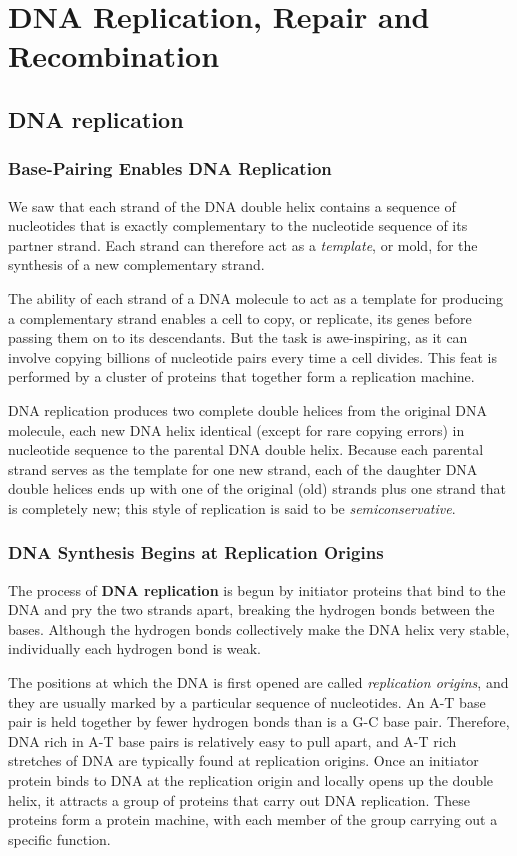 \chapter{DNA Replication, Repair and Recombination}

\section{DNA replication}

\subsection{Base-Pairing Enables DNA Replication}

We saw that each strand of the DNA double
helix contains a sequence of nucleotides that is exactly complementary to
the nucleotide sequence of its partner strand. Each strand can therefore
act as a \textit{template}, or mold, for the synthesis of a new complementary
strand.

The ability of each strand of a DNA molecule to act as a template for
producing a complementary strand enables a cell to copy, or replicate,
its genes before passing them on to its descendants. But the task is awe-inspiring,
as it can involve copying billions of nucleotide pairs every time
a cell divides. This feat is performed by a cluster of proteins that together form
a replication machine.

DNA replication produces two complete double helices from the original
DNA molecule, each new DNA helix identical (except for rare copying
errors) in nucleotide sequence to the parental DNA double helix.
Because each parental strand serves as the template for one
new strand, each of the daughter DNA double helices ends up with one
of the original (old) strands plus one strand that is completely new; this
style of replication is said to be \textit{semiconservative}.

\subsection{DNA Synthesis Begins at Replication Origins}

The process of \textbf{DNA replication} is begun by initiator proteins that bind
to the DNA and pry the two strands apart, breaking the hydrogen bonds
between the bases. Although the hydrogen bonds collectively
make the DNA helix very stable, individually each hydrogen bond is weak.

The positions at which the DNA is first opened are called \textit{replication
origins}, and they are usually marked by a particular sequence of nucleotides.
An A-T base pair is held together by fewer hydrogen bonds than is a G-C base
pair. Therefore, DNA rich in A-T base pairs is relatively easy to pull apart,
and A-T rich stretches of DNA are typically found at replication origins.
Once an initiator protein binds to DNA at the replication origin and
locally opens up the double helix, it attracts a group of proteins that carry
out DNA replication. These proteins form a protein machine, with each
member of the group carrying out a specific function.


